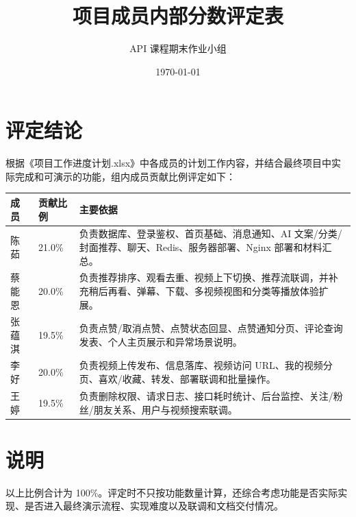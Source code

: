 \documentclass[UTF8,a4paper,12pt,fontset=fandol]{ctexart}
\title{\textbf{项目成员内部分数评定表}}
\author{API 课程期末作业小组}
\date{\today}
\begin{document}
\maketitle

\section{评定结论}
根据《项目工作进度计划.xlsx》中各成员的计划工作内容，并结合最终项目中实际完成和可演示的功能，组内成员贡献比例评定如下：

\begin{table}[H]
\centering
\begin{tabularx}{\textwidth}{p{2.4cm} p{3.0cm} X}
\toprule
成员 & 贡献比例 & 主要依据 \\
\midrule
陈茹 & 21.0\% & 负责数据库、登录鉴权、首页基础、消息通知、AI 文案/分类/封面推荐、聊天、Redis、服务器部署、Nginx 部署和材料汇总。 \\
蔡能恩 & 20.0\% & 负责推荐排序、观看去重、视频上下切换、推荐流联调，并补充稍后再看、弹幕、下载、多视频视图和分类等播放体验扩展。 \\
张蕴淇 & 19.5\% & 负责点赞/取消点赞、点赞状态回显、点赞通知分页、评论查询发表、个人主页展示和异常场景说明。 \\
李好 & 20.0\% & 负责视频上传发布、信息落库、视频访问 URL、我的视频分页、喜欢/收藏、转发、部署联调和批量操作。 \\
王婷 & 19.5\% & 负责删除权限、请求日志、接口耗时统计、后台监控、关注/粉丝/朋友关系、用户与视频搜索联调。 \\
\bottomrule
\end{tabularx}
\end{table}

\section{说明}
以上比例合计为 100\%。评定时不只按功能数量计算，还综合考虑功能是否实际实现、是否进入最终演示流程、实现难度以及联调和文档交付情况。
\end{document}
